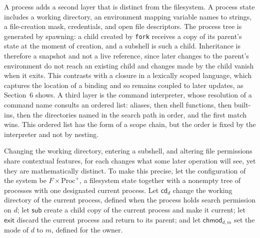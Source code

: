 \documentclass[11pt]{article}
\theoremstyle{definition}
\theoremstyle{remark}
\begin{document}
A process adds a second layer that is distinct from the filesystem. A process state includes a working directory, an environment mapping variable names to strings, a file-creation mask, credentials, and open file descriptors. The process tree is generated by spawning: a child created by \texttt{fork} receives a copy of its parent's state at the moment of creation, and a subshell is such a child. Inheritance is therefore a snapshot and not a live reference, since later changes to the parent's environment do not reach an existing child and changes made by the child vanish when it exits. This contrasts with a closure in a lexically scoped language, which captures the location of a binding and so remains coupled to later updates, as Section~6 shows. A third layer is the command interpreter, whose resolution of a command name consults an ordered list: aliases, then shell functions, then built-ins, then the directories named in the search path in order, and the first match wins. This ordered list has the form of a scope chain, but the order is fixed by the interpreter and not by nesting.

Changing the working directory, entering a subshell, and altering file permissions share contextual features, for each changes what some later operation will see, yet they are mathematically distinct. To make this precise, let the configuration of the system be $F\times\mathrm{Proc}^{+}$, a filesystem state together with a nonempty tree of processes with one designated current process. Let $\mathsf{cd}_d$ change the working directory of the current process, defined when the process holds search permission on $d$; let $\mathsf{sub}$ create a child copy of the current process and make it current; let $\mathsf{exit}$ discard the current process and return to its parent; and let $\mathsf{chmod}_{d,m}$ set the mode of $d$ to $m$, defined for the owner.
\end{document}
